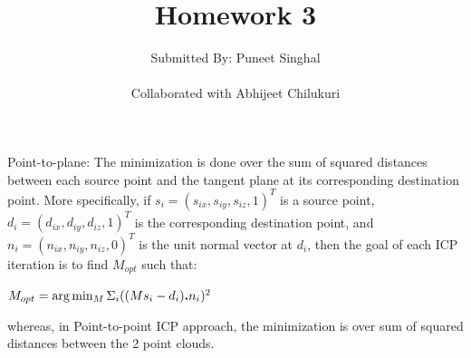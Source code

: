 \documentclass[fleqn]{article}
\title{Homework 3}
\author{Submitted By: Puneet Singhal\\ \\ {Collaborated with Abhijeet Chilukuri}}
\date{}
\begin{document}
\maketitle
{}


\section{ }

\subsection{}
\begin{adjustwidth}{4em}{0pt}
	Point-to-plane: The minimization is done over the sum of squared distances between each source point and the tangent plane at its corresponding destination point. 
	More specifically, if $s_i = (s_{ix}, s_{iy}, s_{iz}, 1)^T$ is a source point, $d_i = (d_{ix}, d_{iy}, d_{iz}, 1)^T$ is the corresponding destination	point, and $n_i = (n_{ix}, n_{iy}, n_{iz}, 0)^T$ is the unit normal vector at $d_i$, then the goal of each ICP iteration is to find $M_{opt}$ such that:
	
	$\\ M_{opt} = \arg \min_M \Sigma_i ((Ms_i - d_i)\boldsymbol{.}n_i)^2 \\$
	
	whereas, in Point-to-point ICP approach, the minimization is over sum of squared distances between the 2 point clouds.
	
\end{adjustwidth}
\end{document}
